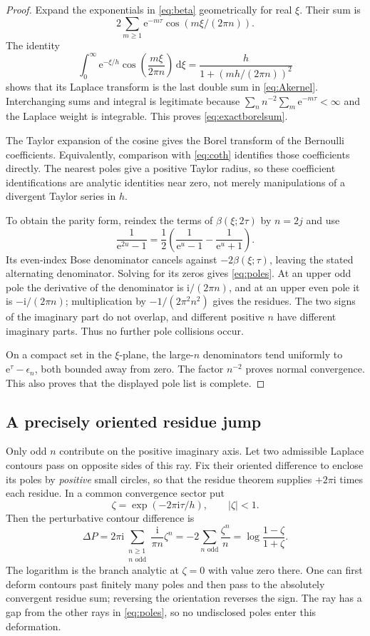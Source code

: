 \documentclass[11pt,a4paper]{article}
\theoremstyle{definition}
\theoremstyle{remark}
\newcommand{\e}{\mathrm e}
\newcommand{\ii}{\mathrm i}
\newcommand{\dd}{\,\mathrm d}
\begin{document}
\begin{proof}
Expand the exponentials in \eqref{eq:beta} geometrically for real $\xi$.
Their sum is
\[2\sum_{m\ge1}\e^{-m\tau}\cos(m\xi/(2\pi n)).\]
The identity
\[
 \int_0^\infty\e^{-\xi/h}\cos\!\left(\frac{m\xi}{2\pi n}\right)\dd\xi
 =\frac{h}{1+(mh/(2\pi n))^2}
\]
shows that its Laplace transform is the last double sum in
\eqref{eq:Akernel}. Interchanging sums and integral is legitimate because
$\sum_n n^{-2}\sum_m\e^{-m\tau}<\infty$ and the Laplace weight is
integrable. This proves \eqref{eq:exactborelsum}.

The Taylor expansion of the cosine gives the Borel transform of the
Bernoulli coefficients. Equivalently, comparison with
\eqref{eq:coth} identifies those coefficients directly. The nearest
poles give a positive Taylor radius, so these coefficient identifications
are analytic identities near zero, not merely manipulations of a divergent
Taylor series in $h$.

To obtain the parity form, reindex the terms of $\beta(\xi;2\tau)$ by
$n=2j$ and use
\[
 \frac1{\e^{2u}-1}
 =\frac12\left(\frac1{\e^u-1}-\frac1{\e^u+1}\right).
\]
Its even-index Bose denominator cancels against $-2\beta(\xi;\tau)$,
leaving the stated alternating denominator. Solving for its zeros gives
\eqref{eq:poles}. At an upper odd pole the derivative of the denominator
is $\ii/(2\pi n)$, and at an upper even pole it is
$-\ii/(2\pi n)$; multiplication by $-1/(2\pi^2n^2)$ gives the residues.
The two signs of the imaginary part do not overlap, and different positive
$n$ have different imaginary parts. Thus no further pole collisions occur.

On a compact set in the $\xi$-plane, the large-$n$ denominators tend
uniformly to $\e^\tau-\epsilon_n$, both bounded away from zero. The factor
$n^{-2}$ proves normal convergence. This also proves that the displayed
pole list is complete.
\end{proof}

\subsection{A precisely oriented residue jump}
Only odd $n$ contribute on the positive imaginary axis. Let two admissible
Laplace contours pass on opposite sides of this ray. Fix their oriented
difference to enclose its poles by \emph{positive} small circles, so that
the residue theorem supplies $+2\pi\ii$ times each residue. In a common
convergence sector put
\[
 \zeta=\exp(-2\pi\ii\tau/h),\qquad |\zeta|<1.
\]
Then the perturbative contour difference is
\begin{equation}
 \Delta P=2\pi\ii\sum_{\substack{n\ge1\\n\text{ odd}}}
 \frac{\ii}{\pi n}\zeta^n
 =-2\sum_{n\text{ odd}}\frac{\zeta^n}{n}
 =\log\frac{1-\zeta}{1+\zeta}.
 \label{eq:jump}
\end{equation}
The logarithm is the branch analytic at $\zeta=0$ with value zero there.
One can first deform contours past finitely many poles and then pass to
the absolutely convergent residue sum; reversing the orientation reverses
the sign. The ray has a gap from the other rays in \eqref{eq:poles}, so
no undisclosed poles enter this deformation.
\end{document}
